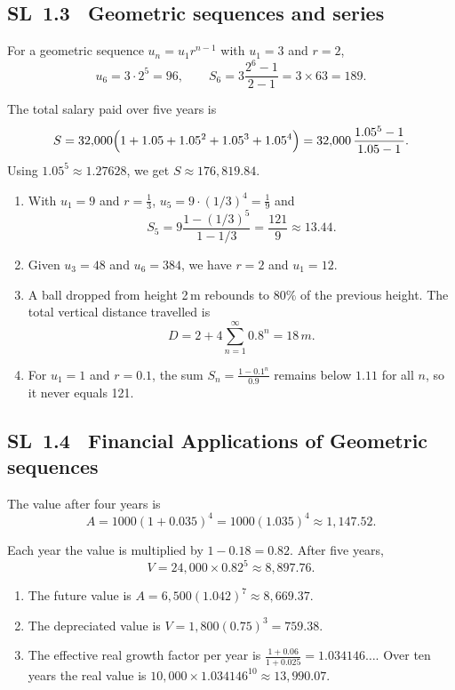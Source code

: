 \documentclass[11pt]{article}
\def\mathrm#1{#1}%
\newcommand{\tocsubsection}[1]{\subsection{#1}}
\begin{document}
\tocsubsection{SL 1.3 \; Geometric sequences and series}

\begin{solution}
For a geometric sequence $u_n = u_1 r^{n-1}$ with $u_1=3$ and $r=2$,
\[
u_6 = 3\cdot 2^{5} = 96,\qquad
S_6 = 3\frac{2^6 - 1}{2 - 1} = 3\times 63 = 189.
\]
\end{solution}

\begin{solution}
The total salary paid over five years is 
\[
S = 32{,}000\Bigl(1 + 1.05 + 1.05^2 + 1.05^3 + 1.05^4\Bigr)
= 32{,}000\,\frac{1.05^5 - 1}{1.05 - 1}.
\]
Using $1.05^5 \approx 1.27628$, we get $S \approx 176{,}819.84$.
\end{solution}

\begin{solution}
\begin{enumerate}[label=(\alph*)]
\item With $u_1=9$ and $r=\tfrac{1}{3}$, $u_5 = 9\cdot (1/3)^{4} = \tfrac{1}{9}$ and 
\[
S_5 = 9\frac{1 - (1/3)^5}{1 - 1/3} = \frac{121}{9} \approx 13.44.
\]
\item Given $u_3=48$ and $u_6=384$, we have $r=2$ and $u_1=12$.
\item A ball dropped from height 2\,m rebounds to $80\%$ of the previous height. The total vertical distance travelled is 
\[
D = 2 + 4 \sum_{n=1}^{\infty}0.8^n = 18\,\mathrm{m}.
\]
\item For $u_1=1$ and $r=0.1$, the sum $S_n = \frac{1 - 0.1^n}{0.9}$ remains below $1.11$ for all $n$, so it never equals 121.
\end{enumerate}
\end{solution}


\tocsubsection{SL 1.4 \; Financial Applications of Geometric sequences}


\begin{solution}
The value after four years is 
\[
A = 1000 (1+0.035)^4 = 1000 (1.035)^4 \approx 1{,}147.52.
\]
\end{solution}

\begin{solution}
Each year the value is multiplied by $1-0.18=0.82$. After five years,
\[
V = 24{,}000 \times 0.82^5 \approx 8{,}897.76.
\]
\end{solution}

\begin{solution}
\begin{enumerate}[label=(\alph*)]
\item The future value is $A = 6{,}500(1.042)^7 \approx 8{,}669.37$.
\item The depreciated value is $V = 1{,}800(0.75)^3 = 759.38$.
\item The effective real growth factor per year is $\frac{1+0.06}{1+0.025} = 1.034146\ldots$.  Over ten years the real value is $10{,}000 \times 1.034146^{10} \approx 13{,}990.07$.
\end{enumerate}
\end{solution}
\end{document}
